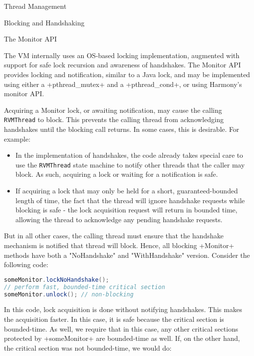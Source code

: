\begin{section}{Thread Management}
\begin{subsection}{Blocking and Handshaking}
\end{subsection}

\begin{subsection}{The Monitor API}

The VM internally uses an OS-based locking implementation, augmented with support for safe lock recursion and awareness of handshakes. The Monitor API provides locking and notification, similar to a Java lock, and may be implemented using either a \spverb+pthread_mutex+ and a \spverb+pthread_cond+, or using Harmony's monitor API.

Acquiring a Monitor lock, or awaiting notification, may cause the calling \texttt{RVM\-Thread} to block. This prevents the calling thread from acknowledging handshakes until the blocking call returns. In some cases, this is desirable. For example:
\begin{itemize}
  \item In the implementation of handshakes, the code already takes special care to use the \texttt{RVM\-Thread} state machine to notify other threads that the caller may block. As such, acquiring a lock or waiting for a notification is safe.
  \item If acquiring a lock that may only be held for a short, guaranteed-bounded length of time, the fact that the thread will ignore handshake requests while blocking is safe - the lock acquisition request will return in bounded time, allowing the thread to acknowledge any pending handshake requests.
\end{itemize}

But in all other cases, the calling thread must ensure that the handshake mechanism is notified that thread will block. Hence, all blocking \spverb+Monitor+ methods have both a "NoHandshake" and "WithHandshake" version. Consider the following code:

\begin{lstlisting}[language=Java]
someMonitor.lockNoHandshake();
// perform fast, bounded-time critical section
someMonitor.unlock(); // non-blocking
\end{lstlisting}

In this code, lock acquisition is done without notifying handshakes. This makes the acquisition faster. In this case, it is safe because the critical section is bounded-time. As well, we require that in this case, any other critical sections protected by \spverb+someMonitor+ are bounded-time as well. If, on the other hand, the critical section was not bounded-time, we would do:


\end{subsection}
\end{section}
